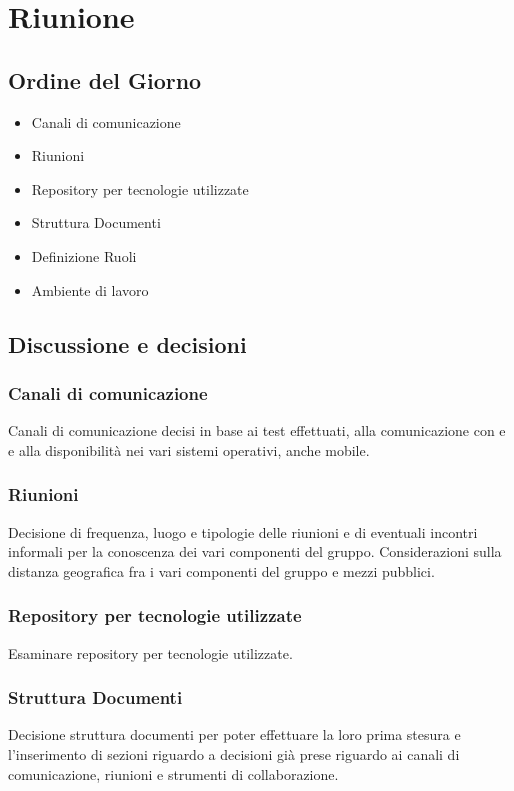 \section{Riunione}
\subsection{Ordine del Giorno}
\begin{itemize}
	\item Canali di comunicazione
	\item Riunioni
	\item Repository per tecnologie utilizzate
	\item Struttura Documenti
	\item Definizione Ruoli
	\item Ambiente di lavoro
\end{itemize}

\subsection{Discussione e decisioni}
\subsubsection{Canali di comunicazione}
Canali di comunicazione decisi in base ai test effettuati, alla comunicazione con \Proponente{} e \Committente{} e alla disponibilità nei vari sistemi operativi, anche mobile.

\subsubsection{Riunioni}
Decisione di frequenza, luogo e tipologie delle riunioni e di eventuali incontri informali per la conoscenza dei vari componenti del gruppo. Considerazioni sulla distanza geografica fra i vari componenti del gruppo e mezzi pubblici.

\subsubsection{Repository per tecnologie utilizzate}
Esaminare repository per tecnologie utilizzate.

\subsubsection{Struttura Documenti}
Decisione struttura documenti per poter effettuare la loro prima stesura e l'inserimento di sezioni riguardo a decisioni già prese riguardo ai canali di comunicazione, riunioni e strumenti di collaborazione.

